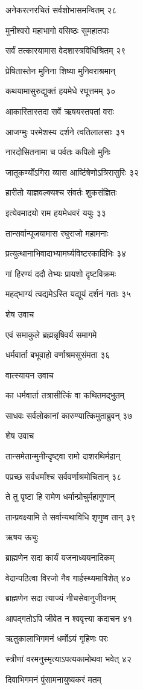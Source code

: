 अनेकरत्नरचितं सर्वशोभासमन्वितम् २८

मुनीश्वरो महाभागो वसिष्ठः सुमहातपाः

सर्वं तत्कारयामास वेदशास्त्रविधिश्रितम् २९

प्रेषितास्तेन मुनिना शिष्या मुनिवराश्रमान्

कथयामासुरुद्युक्तं हयमेधे रघूत्तमम् ३०

आकारितास्तदा सर्वे ऋषयस्तपतां वराः

आजग्मुः परमेशस्य दर्शने त्वतिलालसाः ३१

नारदोसितनामा च पर्वतः कपिलो मुनिः

जातूकर्ण्योंऽगिरा व्यास आर्ष्टिषेणोऽत्रिरासुरिः ३२

हारीतो याज्ञवल्क्यश्च संवर्तः शुकसंज्ञितः

इत्येवमादयो राम हयमेधवरं ययुः ३३

तान्सर्वान्पूजयामास रघुराजो महामनाः

प्रत्युत्थानाभिवादाभ्यामर्घ्यविष्टरकादिभिः ३४

गां हिरण्यं ददौ तेभ्यः प्रायशो दृष्टविक्रमः

महद्भाग्यं त्वद्यमेऽस्ति यद्यूयं दर्शनं गताः ३५

शेष उवाच

एवं समाकुले ब्रह्मन्नृषिवर्य समागमे

धर्मवार्ता बभूवाहो वर्णाश्रमसुसंमता ३६

वात्स्यायन उवाच

का धर्मवार्ता तत्रासीत्किं वा कथितमद्भुतम्

साधवः सर्वलोकानां कारुण्यात्किमुताब्रुवन् ३७

शेष उवाच

तान्समेतान्मुनीन्दृष्ट्वा रामो दाशरथिर्महान्

पप्रच्छ सर्वधर्मांश्च सर्ववर्णाश्रमोचितान् ३८

ते तु पृष्टा हि रामेण धर्मान्प्रोचुर्महागुणान्

तान्प्रवक्ष्यामि ते सर्वान्यथाविधि शृणुष्व तान् ३९

ऋषय ऊचुः

ब्राह्मणेन सदा कार्यं यजनाध्ययनादिकम्

वेदान्पठित्वा विरजो नैव गार्हस्थ्यमाविशेत् ४०

ब्राह्मणेन सदा त्याज्यं नीचसेवानुजीवनम्

आपद्गतोऽपि जीवेत न श्ववृत्त्या कदाचन ४१

ऋतुकालाभिगमनं धर्मोऽयं गृहिणः परः

स्त्रीणां वरमनुस्मृत्याऽपत्यकामोथवा भवेत् ४२

दिवाभिगमनं पुंसामनायुष्यकरं मतम्

